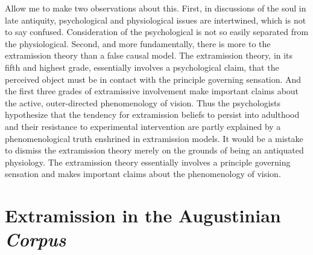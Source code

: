 \documentclass[12pt]{article}
\begin{document}
Allow me to make two observations about this. First, in discussions of the soul in late antiquity, psychological and physiological issues are intertwined, which is not to say confused. Consideration of the psychological is not so easily separated from the physiological. Second, and more fundamentally, there is more to the extramission theory than a false causal model. The extramission theory, in its fifth and highest grade, essentially involves a psychological claim, that the perceived object must be in contact with the principle governing sensation. And the first three grades of extramissive involvement make important claims about the active, outer-directed phenomenology of vision. Thus the psychologists \citet{Winer:1996as} hypothesize that the tendency for extramission beliefs to persist into adulthood and their resistance to experimental intervention are partly explained by a phenomenological truth enshrined in extramission models.
It would be a mistake to dismiss the extramission theory merely on the grounds of being an antiquated physiology. The extramission theory essentially involves a principle governing sensation and makes important claims about the phenomenology of vision.



\section{Extramission in the Augustinian \emph{Corpus}} %
\label{sec:extramission_in_the_augustinian_emph_corpus}
\end{document}
